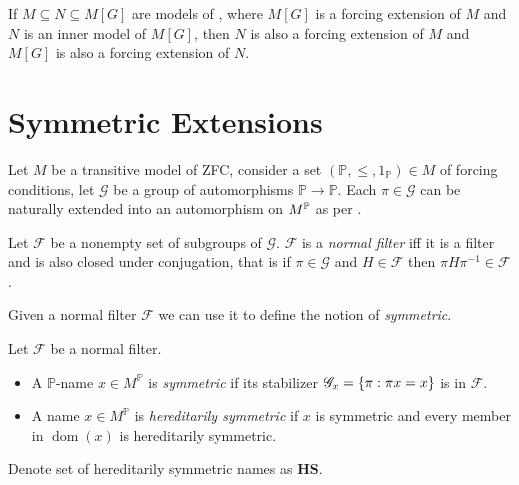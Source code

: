 \begin{theorem}
    \label{proposition:intermediate_model_property}
    If \(M\subseteq N\subseteq M[G]\) are models of \ZFC,
    where \(M[G]\) is a forcing extension of \(M\) and \(N\) is an inner model of \(M[G]\),
    then \(N\) is also a forcing extension of \(M\) and
    \(M[G]\) is also a forcing extension of \(N\).
\end{theorem}


\section{Symmetric Extensions}


\renewcommand*{\G}{\mathscr{G}}
\newcommand*{\dom}{\operatorname{dom}}
\newcommand*{\val}{\operatorname{val}}
Let \(M\) be a transitive model of ZFC, consider a set \((\mathbb{P}, \leq, 1_{\mathbb{P}}) \in M\) of forcing conditions,
let \(\G\) be a group of automorphisms \(\mathbb{P} \to \mathbb{P}\).
Each \(\pi\in \G\) can be naturally extended into an automorphism on \(M^\P\) as per .

\begin{definition}
    Let \(\mathscr{F}\) be a nonempty set of subgroups of \(\G\).
    \(\mathscr{F}\) is a \emph{normal filter} iff it is a filter and is also closed under conjugation, that is
    if \(\pi\in \G\) and \(H\in\mathscr{F}\) then \(\pi H \pi^{-1} \in\mathscr{F}\).
\end{definition}
Given a normal filter \(\mathscr{F}\) we can use it to define the notion of \emph{symmetric}.
\begin{definition}
    Let \(\mathscr{F}\) be a normal filter.
    \begin{itemize}
        \item A \(\mathbb{P}\)-name \(x\in M^{\mathbb{P}}\) is \emph{symmetric} if its stabilizer \(\G_x = \set{\pi: \pi x = x}\) is in \(\mathscr{F}\).
        \item A name \(x\in M^{\mathbb{P}}\) is \emph{hereditarily symmetric} if \(x\) is symmetric and every member in \(\dom(x)\) is hereditarily symmetric.
    \end{itemize}
    Denote set of hereditarily symmetric names as \(\mathbf{HS}\).
\end{definition}

